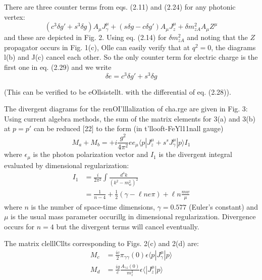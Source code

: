 {There are three counter terms from eqs. (2.11) and (2.24) for any photonic
vertex:
\begin{equation*}
(c^{3}\delta g'+ s^{3}\delta g) A_{\mu} J_{\gamma}^{\mu} + (s \delta g - c \delta g') A_{\mu} J_{z}^{\mu} + \delta m_{zA}^{2} A_{\mu} Z^{\mu} \tag{2.29}
\end{equation*}
and these are depicted in Fig. 2. Using eq. (2.14) for $\delta m^{2}_{zA}$ and noting that
the $Z$ propagator occurs in Fig. 1(c), Olle can easily verify that at $q^{2} = 0$, the
diagrams l(b) and J(c) cancel each other. So the only counter term for electric
charge is the first one in eq. (2.29) and we write
\begin{equation}
\delta e= c^{3} \delta g'+ s^{3}\delta g\tag{2.30}
\end{equation}

(This can be verified to be eOllsistellt. with the differential of eq. (2.28)). 

The divergent diagrams for the renOI'lllalization of cha.rge are given in Fig.
3: Using current algebra methods, the sum of the matrix elements for 3(a) and
3(b) at $p = p'$ can be reduced [22] to the form (in t'llooft-FeYl11nall gauge) 
\begin{equation}
M_{a} +M_{b}=+ i\frac{g^{2}}{4\pi^{2}} e e_{\mu} \langle p| J_{z}^{\mu}+ s^{s} J_{\gamma}^{\mu} | p \rangle I_{1}\tag{2.31}
\end{equation}
where $\epsilon_{\mu}$ is the photon polarization vector and $I_{1}$ is the divergent integral evaluated by dimensional regularization: 
\begin{align*}
I_{1} & = \frac{i}{2\pi^{2}}\int\frac{d^{4}k}{(k^{2}-m^{2}_{w})^{2}}\\
& = \frac{1}{n-4} + \frac{1}{2}(\gamma-\ell n e \pi)+ \ell n \frac{mw}{\mu}\tag{2.32}
\end{align*}
where $n$ is the number of space-time dimensions, $\gamma = 0.577$ (Euler's constant)
and $\mu$ is the usual mass parameter occurillg in dimensional regularization. Divergence occurs for $n = 4$ but the divergent terms will cancel eventually.

The matrix clelllCllts corresponding to Figs. 2(c) and 2(d) are: 
\begin{align*}
M_{c} &= \frac{ic}{2} \pi_{\gamma \gamma} (0)\epsilon\langle p | J_{\gamma}^{\mu} | p\rangle \tag{2.33}\\
M_{d} &= \frac{ig}{c} \frac{A_{\gamma z}(0)}{m^{2}_{z}} \epsilon \langle| J_{z}^{\mu} | p \rangle \tag{2.34}
\end{align*}

}

